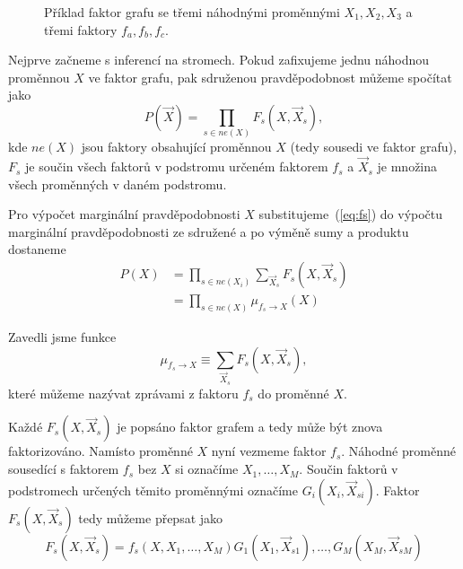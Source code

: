 \begin{figure}[H]
\begin{center}
\end{center}
\caption{Příklad faktor grafu se třemi náhodnými proměnnými $X_1, X_2, X_3$ a třemi faktory $f_a, f_b, f_c$.}
\end{figure}

Nejprve začneme s inferencí na stromech.
Pokud zafixujeme jednu náhodnou proměnnou $X$ ve faktor grafu, pak sdruženou pravděpodobnost můžeme spočítat jako
\begin{equation}
    P(\vec{X}) = \prod_{s \in ne(X)} F_s(X, \vec{X}_s),
\label{eq:fs}
\end{equation}
kde $ne(X)$ jsou faktory obsahující proměnnou $X$ (tedy sousedi ve faktor grafu), $F_s$ je součin všech faktorů v podstromu určeném faktorem $f_s$ a $\vec{X}_s$ je množina všech proměnných v daném podstromu.

Pro výpočet marginální pravděpodobnosti $X$ substitujeme~(\ref{eq:fs}) do výpočtu marginální pravděpodobnosti ze sdružené a po výměně sumy a produktu dostaneme
\begin{align}
P(X) &= \prod_{s \in ne(X_i)} \sum_{\vec{X}_s} F_s(X, \vec{X}_s)
\\
&= \prod_{s \in ne(X)} \mu_{f_s \rightarrow X}(X)
\label{eq:margx}
\end{align}

Zavedli jsme funkce
\begin{equation}
    \mu_{f_s \rightarrow X} \equiv \sum_{\vec{X}_s} F_s(X, \vec{X}_s),
\label{eq:defmsgfx}
\end{equation}
které můžeme nazývat zprávami z faktoru $f_s$ do proměnné $X$.

Každé $F_s(X, \vec{X}_s)$ je popsáno faktor grafem a tedy může být znova faktorizováno.
Namísto proměnné $X$ nyní vezmeme faktor $f_s$.
Náhodné proměnné sousedící s faktorem $f_s$ bez $X$ si označíme $X_1, \dots, X_M$.
Součin faktorů v podstromech určených těmito proměnnými označíme $G_i(X_i, \vec{X}_{si})$.
Faktor $F_s(X, \vec{X}_s)$ tedy můžeme přepsat jako
\begin{equation}
F_s(X, \vec{X}_s) = f_s(X, X_1, \dots, X_M) G_1(X_1, \vec{X}_{s1}), \dots, G_M(X_M, \vec{X}_{sM})
\end{equation}

